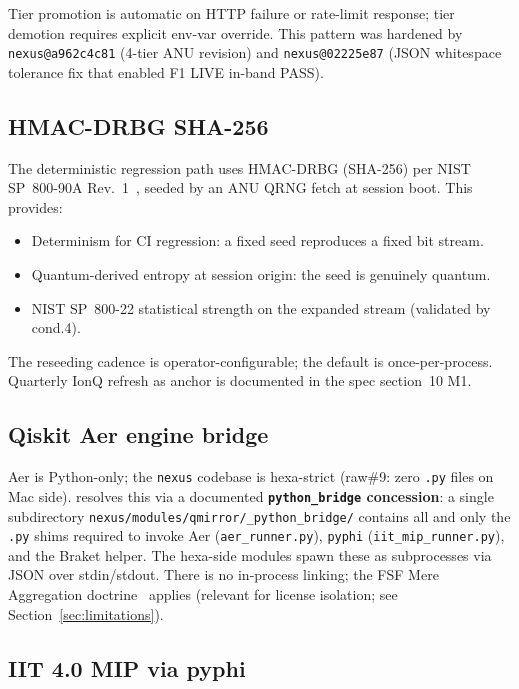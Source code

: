 Tier promotion is automatic on HTTP failure or rate-limit response;
tier demotion requires explicit env-var override. This pattern was
hardened by \texttt{nexus@a962c4c81} (4-tier ANU revision) and
\texttt{nexus@02225e87} (JSON whitespace tolerance fix that enabled
F1 LIVE in-band PASS).

\subsection{HMAC-DRBG SHA-256}

The deterministic regression path uses HMAC-DRBG (SHA-256) per NIST
SP~800-90A Rev.~1~\cite{NIST-SP-800-90A}, seeded by an ANU QRNG fetch
at session boot. This provides:

\begin{itemize}
\item Determinism for CI regression: a fixed seed reproduces a fixed
  bit stream.
\item Quantum-derived entropy at session origin: the seed is genuinely
  quantum.
\item NIST SP~800-22 statistical strength on the expanded stream
  (validated by cond.4).
\end{itemize}

The reseeding cadence is operator-configurable; the default is
once-per-process. Quarterly IonQ refresh as anchor is documented in
the spec section~10 M1.

\subsection{Qiskit Aer engine bridge}

Aer is Python-only; the \texttt{nexus} codebase is hexa-strict (raw\#9:
zero \texttt{.py} files on Mac side). \qmirror{} resolves this via a
documented \textbf{\texttt{python\_bridge} concession}: a single
subdirectory \texttt{nexus/modules/qmirror/\_python\_bridge/} contains
all and only the \texttt{.py} shims required to invoke Aer
(\texttt{aer\_runner.py}), \texttt{pyphi}
(\texttt{iit\_mip\_runner.py}), and the Braket helper. The hexa-side
modules spawn these as subprocesses via JSON over stdin/stdout. There
is no in-process linking; the FSF Mere Aggregation
doctrine~\cite{FSF-MereAggregation} applies (relevant for license
isolation; see Section~\ref{sec:limitations}).

\subsection{IIT 4.0 MIP via pyphi}

